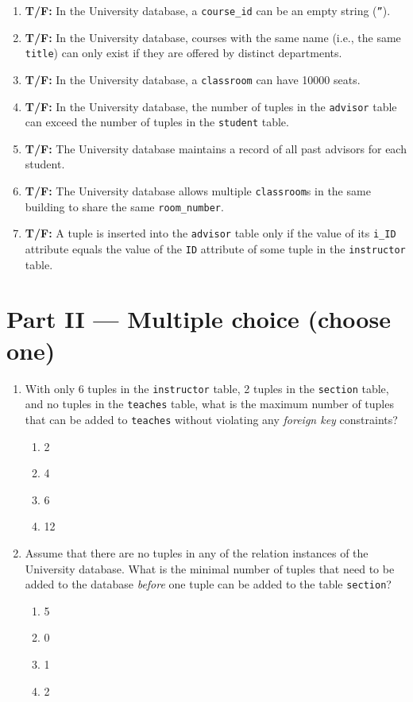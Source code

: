 \documentclass{article}
\begin{document}
\begin{enumerate}
  \item \textbf{T/F:} In the University database, a \texttt{course\_id} can be an empty string (\texttt{''}).
  \item \textbf{T/F:} In the University database, courses with the same name (i.e., the same \texttt{title}) can only exist if they are offered by distinct departments.
  \item \textbf{T/F:} In the University database, a \texttt{classroom} can have 10000 seats.
  \item \textbf{T/F:} In the University database, the number of tuples in the \texttt{advisor} table can exceed the number of tuples in the \texttt{student} table.
  \item \textbf{T/F:} The University database maintains a record of all past advisors for each student.
  \item \textbf{T/F:} The University database allows multiple \texttt{classroom}s in the same building to share the same \texttt{room\_number}.
  \item \textbf{T/F:} A tuple is inserted into the \texttt{advisor} table only if the value of its \texttt{i\_ID} attribute equals the value of the \texttt{ID} attribute of some tuple in the \texttt{instructor} table.

\end{enumerate}

\section*{Part II — Multiple choice (choose one)}
\begin{enumerate}
  \item With only 6 tuples in the \texttt{instructor} table, 2 tuples in the \texttt{section} table, and no tuples in the \texttt{teaches} table, what is the maximum number of tuples that can be added to \texttt{teaches} without violating any \emph{foreign key} constraints?
  \begin{enumerate}
    \item[(A)] 2
    \item[(B)] 4
    \item[(C)] 6
    \item[(D)] 12
  \end{enumerate}
  \item Assume that there are no tuples in any of the relation instances of the University database. What is the minimal number of tuples that need to be added to the database \emph{before} one tuple can be added to the table \texttt{section}?
  \begin{enumerate}
    \item[(A)] 5
    \item[(B)] 0
    \item[(C)] 1
    \item[(D)] 2
  \end{enumerate}
\end{enumerate}
\end{document}
